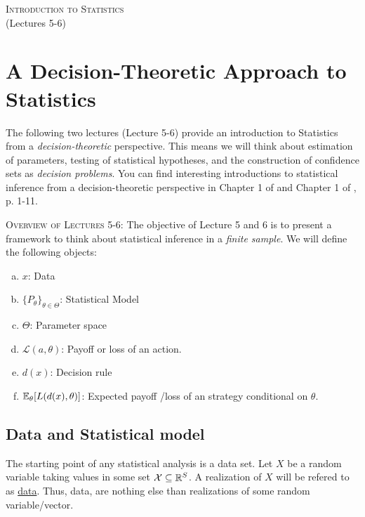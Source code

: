 \documentclass[11pt]{article} %
\begin{document}
\onehalfspace

\vspace*{\fill}
\begingroup
\centering

\Large {\scshape Introduction to Statistics}\\

(Lectures 5-6)

\endgroup
\vspace*{\fill}

\newpage

\section{A Decision-Theoretic Approach to Statistics}
The following two lectures (Lecture 5-6) provide an introduction to Statistics from a \emph{decision-theoretic} perspective. This means we will think about estimation of parameters, testing of statistical hypotheses, and the construction of confidence sets as \emph{decision problems}. You can find interesting introductions to  statistical inference from a decision-theoretic perspective in Chapter 1 of \cite{Lehman05} and Chapter 1 of \cite{Ferguson67}, p. 1-11.

{\scshape Overview of Lectures 5-6:} The objective of Lecture 5 and 6 is to present a framework to think about statistical inference in a \emph{finite sample}.  We will define the following objects:


\begin{enumerate}[a)]
\item $x$: Data
\item $\{P_{\theta}\}_{\theta \in \Theta}$: Statistical Model
\item $\Theta$: Parameter space
\item $\mathcal{L}(a,\theta)$: Payoff or loss  of an action.
\item $d(x)$: Decision rule
\item $\mathbb{E}_{\theta}[L(d(x),\theta)]$: Expected payoff /loss of an strategy conditional on $\theta$.
\end{enumerate}

\subsection{Data and Statistical model}

The starting point of any statistical analysis is a data set. Let $X$ be a random variable taking values in some set $\mathcal{X} \subseteq \mathbb{R}^{S}$. A realization of $X$ will be refered to as \underline{data}. Thus, data, are nothing else than realizations of some random variable/vector. \\
\end{document}

